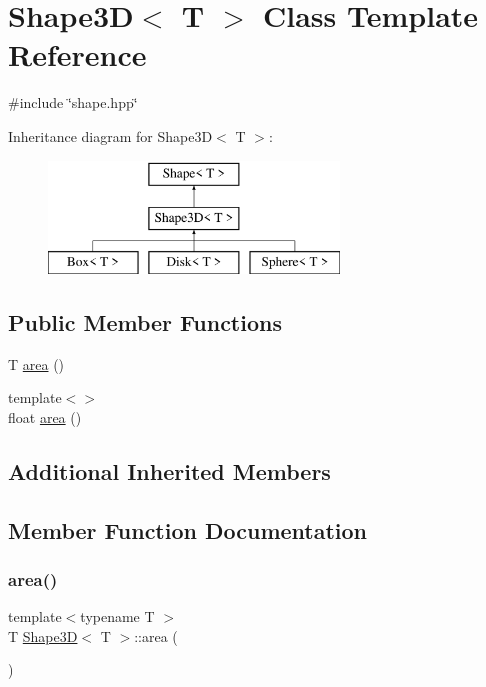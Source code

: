 \hypertarget{classShape3D}{}\section{Shape3D$<$ T $>$ Class Template Reference}
\label{classShape3D}


{\ttfamily \#include \char`\"{}shape.\+hpp\char`\"{}}

Inheritance diagram for Shape3D$<$ T $>$\+:\begin{figure}[H]
\begin{center}
\leavevmode
\includegraphics[height=3.000000cm]{classShape3D}
\end{center}
\end{figure}
\subsection*{Public Member Functions}
\begin{DoxyCompactItemize}
\item 
T \mbox{\hyperlink{classShape3D_add8607daa60f43c6cb71e7162c107d71}{area}} ()
\item 
{\footnotesize template$<$$>$ }\\float \mbox{\hyperlink{classShape3D_ae3c7c5cca570561caf09868885bea389}{area}} ()
\end{DoxyCompactItemize}
\subsection*{Additional Inherited Members}


\subsection{Member Function Documentation}
\mbox{\label{classShape3D_add8607daa60f43c6cb71e7162c107d71}} 
\subsubsection{\texorpdfstring{area()}{area()}\hspace{0.1cm}{\footnotesize\ttfamily [1/2]}}
{\footnotesize\ttfamily template$<$typename T $>$ \\
T \mbox{\hyperlink{classShape3D}{Shape3D}}$<$ T $>$\+::area (\begin{DoxyParamCaption}{ }\end{DoxyParamCaption})}

